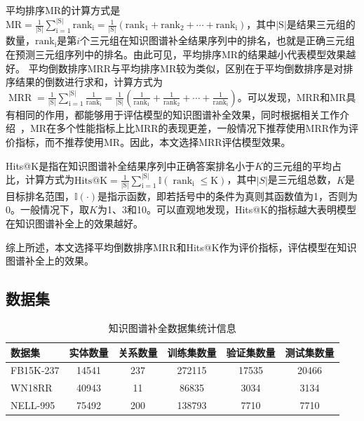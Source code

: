\documentclass[algorithmlist, AutoFakeBold, AutoFakeSlant, figurelist, tablelist, nomlist, engineering, openany]{seuthesix} %
\begin{document}
平均排序MR的计算方式是$\mathrm{MR}=\frac{1}{|\mathrm{S}|} \sum_{\mathrm{i}=1}^{|\mathrm{S}|} \mathrm{rank}_{\mathrm{i}}=\frac{1}{|\mathrm{S}|}\left(\mathrm{rank}_1+\mathrm{rank}_2+\cdots+\mathrm{rank}_{\mathrm{i}}\right)$，其中$|\mathrm{S}|$是结果三元组的数量，$\mathrm{rank}_{\mathrm{i}}$是第$i$个三元组在知识图谱补全结果序列中的排名，也就是正确三元组在预测三元组序列中的排名。由此可见，平均排序MR的结果越小代表模型效果越好。
平均倒数排序MRR与平均排序MR较为类似，区别在于平均倒数排序是对排序结果的倒数进行求和，计算方式为$\operatorname{MRR}=\frac{1}{|\mathrm{S}|} \sum_{\mathrm{i}=1}^{|\mathrm{S}|} \frac{1}{\mathrm{rank}_{\mathrm{i}}}=\frac{1}{|\mathrm{S}|}\left(\frac{1}{\mathrm{rank}_1}+\frac{1}{\mathrm{rank}_2}+\cdots+\frac{1}{\mathrm{rank}_{\mathrm{i}}}\right)$。可以发现，MRR和MR具有相同的作用，都能够用于评估模型的知识图谱补全效果，同时根据相关工作介绍~\cite{hoyt2022unified}，MR在多个性能指标上比MRR的表现更差，一般情况下推荐使用MRR作为评价指标，而不推荐使用MR。因此，本文选择MRR评估模型效果。

Hits@K是指在知识图谱补全结果序列中正确答案排名小于$K$的三元组的平均占比，计算方式为$\mathrm{Hits@K}=\frac{1}{|\mathrm{S}|} \sum_{\mathrm{i}=1}^{|\mathrm{S}|} \mathbb{I}\left(\operatorname{rank}_{\mathrm{i}} \leq \mathrm{K}\right)$，其中$|S|$是三元组总数，$K$是目标排名范围，$\mathbb{I}\left(\cdot\right)$是指示函数，即若括号中的条件为真则其函数值为1，否则为0。一般情况下，取$K$为1、3和10。可以直观地发现，Hits@K的指标越大表明模型在知识图谱补全上的效果越好。

综上所述，本文选择平均倒数排序MRR和Hits@K作为评价指标，评估模型在知识图谱补全上的效果。

\subsection{数据集}
\begin{table}[t]
  \centering
  \caption{知识图谱补全数据集统计信息}
  \begin{tabular*}{0.95\textwidth}{@{\extracolsep{\fill}}lccccc}
    \toprule[1pt]
    数据集 & 实体数量 & 关系数量 & 训练集数量 & 验证集数量 & 测试集数量 \\ \hline
    FB15K-237 & 14541 & 237 & 272115 & 17535 & 20466\\
    WN18RR & 40943 & 11 & 86835 & 3034 & 3134\\
    NELL-995 & 75492 & 200 & 138793 & 7710 & 7710\\
    \bottomrule[1pt]
	\end{tabular*}
  \label{Datasets1}
\end{table}
\end{document}
